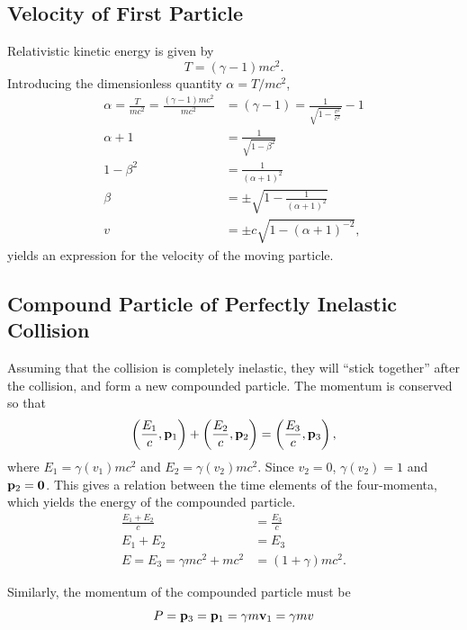 \documentclass[11pt]{amsart}
\begin{document}
\subsection{Velocity of First Particle}
Relativistic kinetic energy is given by
\begin{equation}
\label{eq:relkinenergy}
T = (\gamma-1)mc^2.
\end{equation}
Introducing the dimensionless quantity $\alpha = T/mc^2$,
\begin{align*}
\alpha = \frac{T}{mc^2} = \frac{(\gamma - 1)mc^2}{mc^2} &= (\gamma-1) = \frac{1}{\sqrt{1-\frac{v^2}{c^2}}} - 1 \\
\alpha + 1 &= \frac{1}{\sqrt{1-\beta^2}} \\
1 - \beta^2 &= \frac{1}{(\alpha + 1)^2} \\
\beta &= \pm \sqrt{1 - \frac{1}{(\alpha + 1)^2}} \\
v &= \pm c \sqrt{1-(\alpha + 1)^{-2}},
\end{align*}
yields an expression for the velocity of the moving particle.

\subsection{Compound Particle of Perfectly Inelastic Collision}
Assuming that the collision is completely inelastic, they will ``stick together'' after the collision, and form a new compounded particle. The momentum is conserved so that
\begin{equation}
\label{eq:momentumconservation1}
\left(\frac{E_1}{c}, \vb{p}_1 \right) + \left(\frac{E_2}{c}, \vb{p}_2 \right) = \left(\frac{E_3}{c}, \vb{p}_3 \right) ,
\end{equation}
where $E_1 = \gamma(v_1)mc^2$ and $E_2 = \gamma(v_2)mc^2$. Since $v_2 = 0$, $\gamma(v_2) = 1$ and $\vb{p}_2 = \vb{0}$. This gives a relation between the time elements of the four-momenta, which yields the energy of the compounded particle.
\begin{align}
\frac{E_1 + E_2}{c} &= \frac{E_3}{c} \nonumber \\
E_1 + E_2 &= E_3 \nonumber \\
\label{eq:compoundedenergy1}
E = E_3 =  \gamma mc^2 + mc^2 &= (1 + \gamma)mc^2.
\end{align}

Similarly, the momentum of the compounded particle must be
\begin{equation}
P = \vb{p}_3 = \vb{p}_1 = \gamma m\vb{v}_1 = \gamma m v 
\end{equation}
\end{document}
